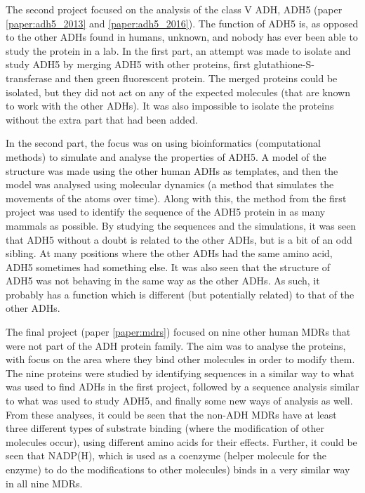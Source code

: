 \documentclass[a4paper, twoside, 12pt, openright]{report}
\begin{document}
\thispagestyle{empty}

The second project focused on the analysis of the class V ADH, ADH5 (paper \ref{paper:adh5_2013} and \ref{paper:adh5_2016}). The function of ADH5 is, as opposed to the other ADHs found in humans, unknown, and nobody has ever been able to study the protein in a lab. In the first part, an attempt was made to isolate and study ADH5 by merging ADH5 with other proteins, first glutathione-S-transferase and then green fluorescent protein. The merged proteins could be isolated, but they did not act on any of the expected molecules (that are known to work with the other ADHs). It was also impossible to isolate the proteins without the extra part that had been added.

In the second part, the focus was on using bioinformatics (computational methods) to simulate and analyse the properties of ADH5. A model of the structure was made using the other human ADHs as templates, and then the model was analysed using molecular dynamics (a method that simulates the movements of the atoms over time). Along with this, the method from the first project was used to identify the sequence of the ADH5 protein in as many mammals as possible. By studying the sequences and the simulations, it was seen that ADH5 without a doubt is related to the other ADHs, but is a bit of an odd sibling. At many positions where the other ADHs had the same amino acid, ADH5 sometimes had something else. It was also seen that the structure of ADH5 was not behaving in the same way as the other ADHs. As such, it probably has a function which is different (but potentially related) to that of the other ADHs.

The final project (paper \ref{paper:mdrs}) focused on nine other human MDRs that were not part of the ADH protein family. The aim was to analyse the proteins, with focus on the area where they bind other molecules in order to modify them. The nine proteins were studied by identifying sequences in a similar way to what was used to find ADHs in the first project, followed by a sequence analysis similar to what was used to study ADH5, and finally some new ways of analysis as well. From these analyses, it could be seen that the non-ADH MDRs have at least three different types of substrate binding (where the modification of other molecules occur), using different amino acids for their effects. Further, it could be seen that NADP(H), which is used as a coenzyme (helper molecule for the enzyme) to do the modifications to other molecules) binds in a very similar way in all nine MDRs.
\end{document}
